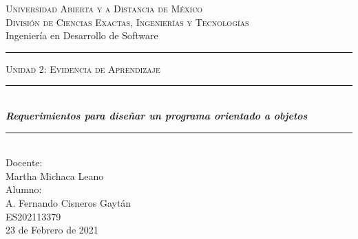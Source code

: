 \begin{titlepage}

\newcommand{\HRule}{\rule{\linewidth}{0.5mm}} %

\center %


\begin{minipage}{14cm}
\center



\textsc{\Large Universidad Abierta y a Distancia de México}\\[1.5cm] 

\textsc{\Large División de Ciencias Exactas, Ingenierías y Tecnologías}\\[0.5cm] 

\LARGE{Ingeniería en Desarrollo de Software}\\[1.5cm]


\rule[1.7mm]{2cm}{0.5mm}
\hfill
\textsc{\Large Unidad 2: Evidencia de Aprendizaje} 
\hfill
\rule[1.7mm]{2cm}{0.5mm} 
\\[0.75cm]

{\Huge
\textbf{\textit{
Requerimientos para diseñar un programa orientado a objetos
}}}\\[0.5cm] 

\HRule \\[1.5cm]


{\Large
Docente: \\
Martha Michaca Leano} \\[0.5cm]


{\Large
Alumno: \\
A. Fernando Cisneros Gaytán \\
ES202113379} \\[0.5cm]


{\large
23 de Febrero de 2021
}

\end{minipage}

\vfill %

\thispagestyle{empty}
\end{titlepage}

\raggedbottom

